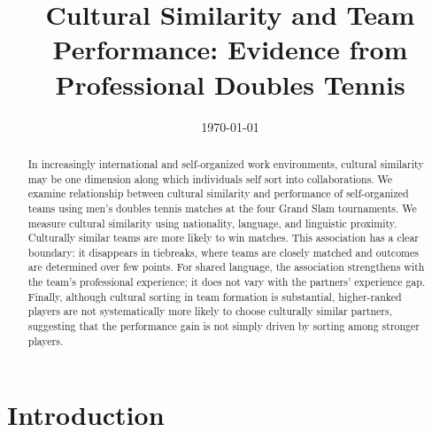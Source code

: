 \documentclass[10pt]{article}
\title{Cultural Similarity and Team Performance: Evidence from Professional Doubles Tennis}
\author{}
\date{\today}
\begin{document}
\maketitle
\thispagestyle{empty}

\begin{abstract}


In increasingly international and self-organized work environments, cultural similarity may be one dimension along which individuals self sort into collaborations. %
We examine relationship between cultural similarity and  performance of self-organized teams using men’s doubles tennis matches at the four Grand Slam tournaments. We measure cultural similarity using nationality,  language, and linguistic proximity. Culturally similar teams are more likely to win matches. This association has a clear boundary: it disappears in tiebreaks, where teams are closely matched and outcomes are determined over few points. For shared language, the association strengthens with the team's professional experience; it does not vary with the partners' experience gap. Finally, although cultural sorting in team formation is substantial, higher-ranked players are not systematically more likely to choose culturally similar partners, suggesting that the performance gain is not simply driven by sorting among stronger players.
\end{abstract}
\newpage
\setcounter{page}{1}
\section{Introduction}
\end{document}
